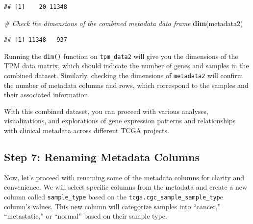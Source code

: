 \documentclass[
]{book}
\newenvironment{Shaded}{\begin{snugshade}}{\end{snugshade}}
\newcommand{\CommentTok}[1]{\textcolor[rgb]{0.56,0.35,0.01}{\textit{#1}}}
\newcommand{\FunctionTok}[1]{\textcolor[rgb]{0.13,0.29,0.53}{\textbf{#1}}}
\newcommand{\NormalTok}[1]{#1}
\begin{document}
\begin{verbatim}
## [1]    20 11348
\end{verbatim}

\begin{Shaded}
\begin{Highlighting}[]
\CommentTok{\# Check the dimensions of the combined metadata data frame}
\FunctionTok{dim}\NormalTok{(metadata2)}
\end{Highlighting}
\end{Shaded}

\begin{verbatim}
## [1] 11348   937
\end{verbatim}

Running the \texttt{dim()} function on \texttt{tpm\_data2} will give you the dimensions of the TPM data matrix, which should indicate the number of genes and samples in the combined dataset. Similarly, checking the dimensions of \texttt{metadata2} will confirm the number of metadata columns and rows, which correspond to the samples and their associated information.

With this combined dataset, you can proceed with various analyses, visualizations, and explorations of gene expression patterns and relationships with clinical metadata across different TCGA projects.

\hypertarget{step-7-renaming-metadata-columns}{%
\subsection{Step 7: Renaming Metadata Columns}\label{step-7-renaming-metadata-columns}}

Now, let's proceed with renaming some of the metadata columns for clarity and convenience. We will select specific columns from the metadata and create a new column called \texttt{sample\_type} based on the \texttt{tcga.cgc\_sample\_sample\_typ}e column's values. This new column will categorize samples into ``cancer,'' ``metastatic,'' or ``normal'' based on their sample type.
\end{document}
